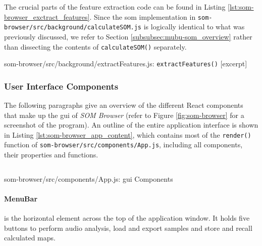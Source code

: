 \smallskip

The crucial parts of the feature extraction code can be found in Listing
\ref{lst:som-browser_exctract_features}. Since the \gls{som} implementation in
\texttt{som-browser/src/background/calculateSOM.js} is logically identical to
what was previously discussed, we refer to Section
\ref{subsubsec:mubu-som_overview} rather than dissecting the contents of
\texttt{calculateSOM()} separately.

\begin{listing}[!htb]
  \caption{som-browser/src/background/extractFeatures.js:
  \texttt{extractFeatures()} [excerpt]}
  \label{lst:som-browser_exctract_features}
\end{listing}

\subsubsection{User Interface Components}
\label{subsubsec:som-browser_components}
The following paragraphs give an overview of the different React components
that make up the \gls{gui} of \textit{SOM Browser} (refer to Figure
\ref{fig:som-browser} for a screenshot of the program). An outline of the entire
application interface is shown in Listing \ref{lst:som-browser_app_content},
which contains most of the \texttt{render()} function of
\texttt{som-browser/src/components/App.js}, including all components, their
properties and functions.

\begin{listing}[!htb]
  \begin{mdframed}
    \inputminted[numbers=left, firstline=405, lastline=459,
    fontsize=\scriptsize]{jsx}{../dev/som-browser/src/components/App.js}
  \end{mdframed}
  \caption{som-browser/src/components/App.js:
  \gls{gui} Components}
  \label{lst:som-browser_app_content}
\end{listing}


\paragraph{MenuBar}
\label{para:menu_bar}
is the horizontal element across the top of the application window. It holds
five buttons to perform audio analysis, load and export samples and store and
recall calculated maps.

